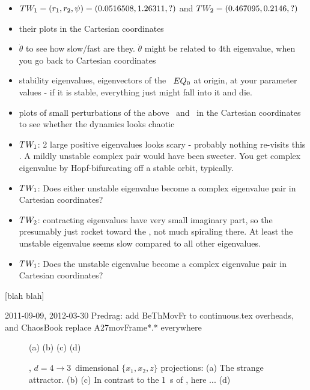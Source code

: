 \begin{itemize}
  \item $TW_{1} = (r_1,r_2,\psi)=(0.0516508, 1.26311,?)$ and
        $TW_{2} = (0.467095,0.2146,?)$
  \item their plots in the Cartesian coordinates
  \item $\dot{\theta}$ to see how slow/fast are they. $\dot{\theta}$
        might be related to 4th eigenvalue, when you go back
        to Cartesian coordinates
  \item stability eigenvalues, eigenvectors of the \eqv\ $EQ_{0}$ at
        origin, at your parameter values - if it is stable, everything
        just might fall into it and die.
  \item plots of small perturbations of the above \eqv\ and \reqva\ in
        the Cartesian coordinates to see whether the dynamics looks
        chaotic
  \item $TW_{1}$: 2 large positive eigenvalues looks scary - probably
        nothing re-visits this \reqv. A mildly unstable complex pair
        would have been sweeter. You get complex eigenvalue by Hopf-bifurcating off a
        stable orbit, typically.
  \item $TW_{1}$: Does either unstable eigenvalue become a complex
        eigenvalue pair in Cartesian coordinates?
  \item $TW_{2}$: contracting eigenvalues have very small imaginary
        part, so the presumably just rocket toward the \reqv, not much
        spiraling there. At least the unstable eigenvalue seems slow
        compared to all other eigenvalues.
  \item $TW_{1}$: Does the unstable eigenvalue become a complex
        eigenvalue pair in Cartesian coordinates?
\end{itemize}

 [blah blah]



 2011-09-09, 2012-03-30 Predrag: add BeThMovFr to
            continuous.tex overheads, and ChaosBook
 replace A27movFrame*.* everywhere
\begin{figure}
  	\begin{center}
(a)
(b)
(c)
(d)
    \end{center}
  \caption{
  \twoMode, $d=4 \to 3$~dimensional $\{x_1,x_2,z\}$ projections:
  (a)
  The strange attractor.
  (b)
 (c)
 In contrast
 to the 1\dmn\ \poincBord s of , here ...
 (d)
  }
\label{fig:2ModeAtlas}
\end{figure}

